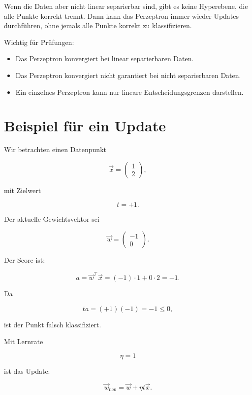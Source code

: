Wenn die Daten aber nicht linear separierbar sind, gibt es keine Hyperebene, die alle Punkte korrekt trennt.
Dann kann das Perzeptron immer wieder Updates durchführen, ohne jemals alle Punkte korrekt zu klassifizieren.

\begin{examtipbox}
Wichtig für Prüfungen:

\begin{itemize}
    \item Das Perzeptron konvergiert bei linear separierbaren Daten.
    \item Das Perzeptron konvergiert nicht garantiert bei nicht separierbaren Daten.
    \item Ein einzelnes Perzeptron kann nur lineare Entscheidungsgrenzen darstellen.
\end{itemize}
\end{examtipbox}

\section{Beispiel für ein Update}

Wir betrachten einen Datenpunkt

\[
    \vec{x}
    =
    \begin{pmatrix}
        1 \\
        2
    \end{pmatrix},
\]

mit Zielwert

\[
    t=+1.
\]

Der aktuelle Gewichtsvektor sei

\[
    \vec{w}
    =
    \begin{pmatrix}
        -1 \\
        0
    \end{pmatrix}.
\]

Der Score ist:

\[
    a
    =
    \vec{w}^{\top}\vec{x}
    =
    (-1)\cdot 1 + 0\cdot 2
    =
    -1.
\]

Da

\[
    t a
    =
    (+1)(-1)
    =
    -1
    \leq 0,
\]

ist der Punkt falsch klassifiziert.

Mit Lernrate

\[
    \eta=1
\]

ist das Update:

\[
    \vec{w}_{\mathrm{neu}}
    =
    \vec{w}
    +
    \eta t\vec{x}.
\]

